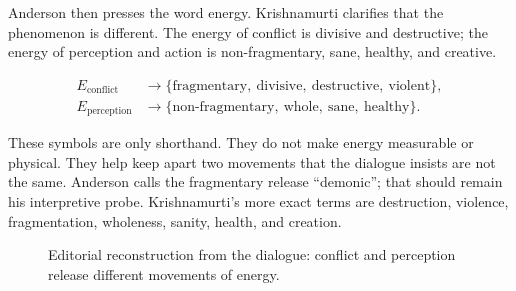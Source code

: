 \documentclass[11pt,oneside]{book}
\begin{document}
Anderson then presses the word energy. Krishnamurti clarifies that the phenomenon is different. The energy of conflict is divisive and destructive; the energy of perception and action is non-fragmentary, sane, healthy, and creative.

\begin{align}
E_{\mathrm{conflict}}
&\longrightarrow
\{\text{fragmentary},\ \text{divisive},\ \text{destructive},\ \text{violent}\},\\
E_{\mathrm{perception}}
&\longrightarrow
\{\text{non-fragmentary},\ \text{whole},\ \text{sane},\ \text{healthy}\}.
\end{align}

These symbols are only shorthand. They do not make energy measurable or physical. They help keep apart two movements that the dialogue insists are not the same. Anderson calls the fragmentary release ``demonic''; that should remain his interpretive probe. Krishnamurti's more exact terms are destruction, violence, fragmentation, wholeness, sanity, health, and creation.

\begin{figure}
\centering
{}
\caption{Editorial reconstruction from the dialogue: conflict and perception release different movements of energy.}
\end{figure}
\end{document}
